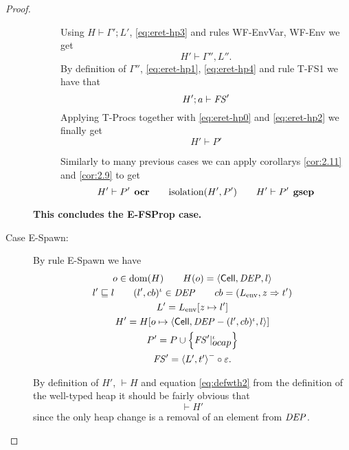 \begin{proof}
\begin{description}
\begin{description}
          Using $H \vdash \Gamma'; L'$, \eqref{eq:eret-hp3} and rules {\sc WF-EnvVar}, {\sc
          WF-Env} we get
          \begin{equation} \label{eq:eret-hp4}
            H' \vdash \Gamma'', L''.
          \end{equation}
          By definition of $\Gamma''$, \eqref{eq:eret-hp1}, \eqref{eq:eret-hp4}
          and rule {\sc T-FS1} we have that
          \begin{equation} \label{eq:eret-hp2}
            H';a \vdash \mathit{FS}'
          \end{equation}
          Applying {\sc T-Procs} together with \eqref{eq:eret-hp0} and
          \eqref{eq:eret-hp2} we finally get
          \begin{equation}
            H' \vdash P'
          \end{equation}

          Similarly to many previous cases we can apply corollarys
          \ref{cor:2.11} and \ref{cor:2.9} to get
          \begin{equation*}
            H' \vdash P' \:\: \mbox{\bf ocr} \quad\quad \mbox{$\mathrm{isolation}$}(H', P') \quad\quad H'
            \vdash P' \:\: \mbox{\bf gsep}
          \end{equation*}
      \end{description}
      {\bf This concludes the {\sc E-FSProp} case.}
      
    \item[Case {\sc E-Spawn}:] By rule {\sc E-Spawn} we have
      \begin{equation}
        \begin{gathered} \label{eq:espawn1}
          o \in \mbox{$\mathrm{dom}$}(H) \quad\quad H(o) = \mbox{$\langle \mbox{$\mathsf{Cell}$}{}, \mathit{DEP}, l \rangle$} \\
          l' \sqsubseteq l \quad\quad (l', cb)^\iota \in \mathit{DEP} \quad\quad cb =
          (L_{\text{env}}, z \Rightarrow t') \\
          L' = L_{\text{env}}[z \mapsto l'] \\
          H' = H[o \mapsto \mbox{$\langle \mbox{$\mathsf{Cell}$}{}, \mathit{DEP} - (l', cb)^\iota, l \rangle$}] \\
          P' = P \cup \left\{ \mathit{FS}'|_{\mbox{$ocap$}}^\iota \right\} \\
          \mathit{FS}' = \mbox{$\langle L', t' \rangle$}^- \circ \varepsilon.
        \end{gathered}
      \end{equation}
      
      By definition of $H'$, $\vdash H$ and equation \eqref{eq:defwth2} from the
      definition of the well-typed heap it should be fairly obvious that
      \begin{equation}
        \vdash H'
      \end{equation}
      since the only heap change is a removal of an element from $\mathit{DEP}$. 



\end{description}
\end{proof}
